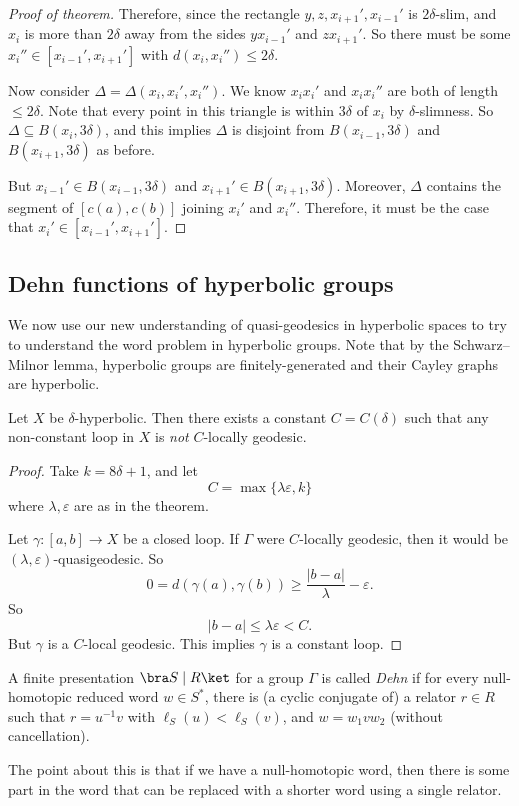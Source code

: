 \documentclass[a4paper]{article}
\begin{document}
\begin{proof}[Proof of theorem]
  Therefore, since the rectangle $y, z, x_{i + 1}', x_{i - 1}'$ is $2\delta$-slim, and $x_i$ is more than $2\delta$ away from the sides $y x_{i - 1}'$ and $z x_{i + 1}'$. So there must be some $x_i'' \in [x_{i - 1}', x_{i + 1}']$ with $d(x_i, x_i'') \leq 2 \delta$.

  Now consider $\Delta = \Delta(x_i, x_i', x_i'')$. We know $x_i x_i'$ and $x_i x_i''$ are both of length $\leq 2 \delta$. Note that every point in this triangle is within $3\delta$ of $x_i$ by $\delta$-slimness. So $\Delta \subseteq B(x_i, 3 \delta)$, and this implies $\Delta$ is disjoint from $B(x_{i - 1}, 3 \delta)$ and $B(x_{i + 1}, 3 \delta)$ as before.

  But $x_{i - 1}' \in B(x_{i - 1}, 3 \delta)$ and $x_{i + 1}' \in B(x_{i + 1}, 3\delta)$. Moreover, $\Delta$ contains the segment of $[c(a), c(b)]$ joining $x_i'$ and $x_i''$. Therefore, it must be the case that $x_i' \in [x_{i - 1}', x_{i + 1}']$.
\end{proof}

\subsection{Dehn functions of hyperbolic groups}
We now use our new understanding of quasi-geodesics in hyperbolic spaces to try to understand the word problem in hyperbolic groups. Note that by the Schwarz--Milnor lemma, hyperbolic groups are finitely-generated and their Cayley graphs are hyperbolic.

\begin{cor}
  Let $X$ be $\delta$-hyperbolic. Then there exists a constant $C = C(\delta)$ such that any non-constant loop in $X$ is \emph{not} $C$-locally geodesic.
\end{cor}

\begin{proof}
  Take $k = 8 \delta + 1$, and let
  \[
    C = \max \{\lambda \varepsilon, k\}
  \]
  where $\lambda, \varepsilon$ are as in the theorem.

  Let $\gamma: [a, b] \to X$ be a closed loop. If $\Gamma$ were $C$-locally geodesic, then it would be $(\lambda, \varepsilon)$-quasigeodesic. So
  \[
    0 = d(\gamma(a), \gamma(b)) \geq \frac{|b - a|}{\lambda} - \varepsilon.
  \]
  So
  \[
    |b - a| \leq \lambda \varepsilon < C.
  \]
  But $\gamma$ is a $C$-local geodesic. This implies $\gamma$ is a constant loop.
\end{proof}

\begin{defi}
  A finite presentation $\bra S \mid R \ket$ for a group $\Gamma$ is called \emph{Dehn} if for every null-homotopic reduced word $w \in S^*$, there is (a cyclic conjugate of) a relator $r \in R$ such that $r = u^{-1}v$ with $\ell_S(u) < \ell_S(v)$, and $w = w_1 v w_2$ (without cancellation).
\end{defi}
The point about this is that if we have a null-homotopic word, then there is some part in the word that can be replaced with a shorter word using a single relator.
\end{document}
